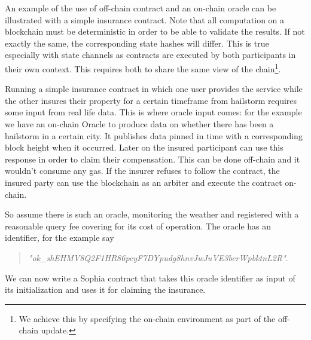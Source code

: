 An example of the use of off-chain contract and an on-chain oracle can be
illustrated with a simple insurance contract. Note that all computation on a
blockchain must be deterministic in order to be able to validate the results.
If not exactly the same, the corresponding state hashes will differ. This is
true especially with state channels as contracts are executed by both
participants in their own context. This requires both to share the same view
of the chain\footnote{We achieve this by specifying the on-chain environment
as part of the off-chain update.}.

Running a simple insurance contract in which one user provides the service
while the other insures their property for a certain timeframe from hailstorm
requires some input from real life data. This is where oracle input comes: for
the example we have an on-chain Oracle to produce data on whether there has
been a hailstorm in a certain city. It publishes data pinned in time with a
corresponding block height when it occurred. Later on the insured participant
can use this response in order to claim their compensation. This can be done
off-chain and it wouldn't consume any gas. If the insurer refuses to follow
the contract, the insured party can use the blockchain as an arbiter and
execute the contract on-chain.

So assume there is such an oracle, monitoring the weather and registered with
a reasonable query fee covering for its cost of operation. The oracle has an
identifier, for the example say
\begin{quote}
  \textit{"ok\_shEHMV8Q2F1HR86pcyF7DYpudg8hnvJwJuVE3berWpbktnL2R"}.
\end{quote}
We can now write a Sophia contract that takes this oracle identifier as input
of its initialization and uses it for claiming the insurance. 

